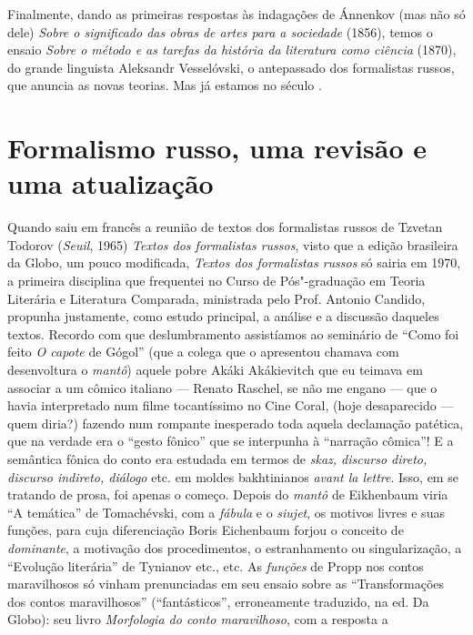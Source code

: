 Finalmente, dando as primeiras respostas às indagações de Ánnenkov (mas
não só dele) \emph{Sobre o significado das obras de artes para a sociedade}
(1856), temos o ensaio \emph{Sobre o método e as tarefas da história da
literatura como ciência} (1870), do grande linguista Aleksandr
Vesselóvski, o antepassado dos formalistas russos, que anuncia as novas
teorias. Mas já estamos no século .

\chapter{Formalismo russo, uma revisão e uma atualização}

Quando saiu em francês a reunião de textos dos formalistas russos de
Tzvetan Todorov (\emph{Seuil}, 1965) \emph{Textos dos formalistas
russos}, visto que a edição brasileira da Globo, um pouco modificada,
\emph{Textos dos formalistas russos} só sairia em 1970, a primeira
disciplina que frequentei no Curso de Pós"-graduação em Teoria Literária
e Literatura Comparada, ministrada pelo Prof. Antonio Candido, propunha
justamente, como estudo principal, a análise e a discussão daqueles
textos. Recordo com que deslumbramento assistíamos ao seminário de
``Como foi feito \emph{O capote} de Gógol'' (que a colega que o
apresentou chamava com desenvoltura o \emph{mantô}) aquele pobre Akáki
Akákievitch que eu teimava em associar a um cômico italiano --- Renato
Raschel, se não me engano --- que o havia interpretado num filme
tocantíssimo no Cine Coral, (hoje desaparecido --- quem diria?) fazendo num rompante inesperado toda aquela declamação patética, que na
verdade era o ``gesto fônico'' que se interpunha à ``narração cômica''!
E a semântica fônica do conto era estudada em termos de \emph{skaz,
discurso direto, discurso indireto, diálogo} etc. em moldes bakhtinianos
\emph{avant la lettre}. Isso, em se tratando de prosa, foi apenas o começo.
Depois do \emph{mantô} de Eikhenbaum viria ``A temática'' de
Tomachévski, com a \emph{fábula} e o \emph{siujet}, os motivos livres e
suas funções, para cuja diferenciação Boris Eichenbaum forjou o conceito
de \emph{dominante}, a motivação dos procedimentos, o estranhamento ou
singularização, a ``Evolução literária'' de Tynianov etc., etc. As
\emph{funções} de Propp nos contos maravilhosos só vinham prenunciadas
em seu ensaio sobre as ``Transformações dos contos maravilhosos''
(``fantásticos'', erroneamente traduzido, na ed. Da Globo): seu livro
\emph{Morfologia do conto maravilhoso}, com a resposta a
